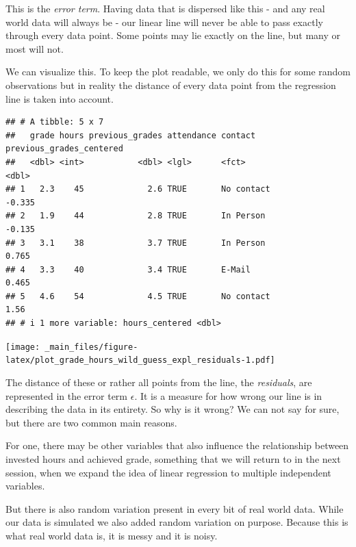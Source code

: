 \documentclass[
]{book}
\begin{document}
This is the \emph{error term}. Having data that is dispersed like this - and any real
world data will always be - our linear line will never be able to pass exactly
through every data point. Some points may lie exactly on the line, but many or
most will not.

We can visualize this. To keep the plot readable, we only do this for some
random observations but in reality the distance of every data point from the
regression line is taken into account.

\begin{verbatim}
## # A tibble: 5 x 7
##   grade hours previous_grades attendance contact    previous_grades_centered
##   <dbl> <int>           <dbl> <lgl>      <fct>                         <dbl>
## 1   2.3    45             2.6 TRUE       No contact                   -0.335
## 2   1.9    44             2.8 TRUE       In Person                    -0.135
## 3   3.1    38             3.7 TRUE       In Person                     0.765
## 4   3.3    40             3.4 TRUE       E-Mail                        0.465
## 5   4.6    54             4.5 TRUE       No contact                    1.56 
## # i 1 more variable: hours_centered <dbl>
\end{verbatim}

\texttt{[image: \_main\_files/figure-latex/plot\_grade\_hours\_wild\_guess\_expl\_residuals-1.pdf]}

The distance of these or rather all points from the line, the \emph{residuals}, are
represented in the error term \(\epsilon\). It is a measure for how wrong our line
is in describing the data in its entirety. So why is it wrong? We can not say
for sure, but there are two common main reasons.

For one, there may be other variables that also influence the relationship
between invested hours and achieved grade, something that we will return to
in the next session, when we expand the idea of linear regression to multiple
independent variables.

But there is also random variation present in every bit of real world data.
While our data is simulated we also added random variation on purpose. Because
this is what real world data is, it is messy and it is noisy.
\end{document}
